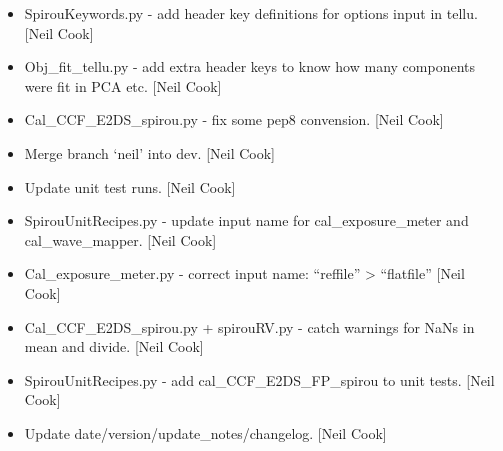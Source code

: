 \documentclass[a4paper,10pt,english]{report}
\begin{document}
\begin{itemize}
\item {} 
SpirouKeywords.py - add header key definitions for options input in
tellu. {[}Neil Cook{]}

\item {} 
Obj\_fit\_tellu.py - add extra header keys to know how many components
were fit in PCA etc. {[}Neil Cook{]}

\item {} 
Cal\_CCF\_E2DS\_spirou.py - fix some pep8 convension. {[}Neil Cook{]}

\item {} 
Merge branch ‘neil’ into dev. {[}Neil Cook{]}

\item {} 
Update unit test runs. {[}Neil Cook{]}

\item {} 
SpirouUnitRecipes.py - update input name for cal\_exposure\_meter and
cal\_wave\_mapper. {[}Neil Cook{]}

\item {} 
Cal\_exposure\_meter.py - correct input name: “reffile” \textendash{}\textgreater{} “flatfile”
{[}Neil Cook{]}

\item {} 
Cal\_CCF\_E2DS\_spirou.py + spirouRV.py - catch warnings for NaNs in mean
and divide. {[}Neil Cook{]}

\item {} 
SpirouUnitRecipes.py - add cal\_CCF\_E2DS\_FP\_spirou to unit tests. {[}Neil
Cook{]}

\item {} 
Update date/version/update\_notes/changelog. {[}Neil Cook{]}

\end{itemize}
\end{document}
